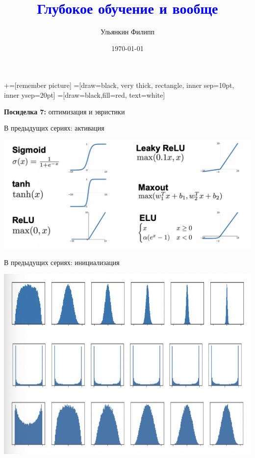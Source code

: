 \documentclass[notes,12pt, aspectratio=169]{beamer}
\title[]{\textcolor{blue}{Глубокое обучение и вообще}}
\author{Ульянкин Филипп}
\date{\today}
\begin{document}
\newcommand\marktopleft[1]{%
    \tikz[overlay,remember picture] 
        \node (marker-#1-a) at (-.3em,.3em) {};%
}
\newcommand\markbottomright[2]{%
    \tikz[overlay,remember picture] 
        \node (marker-#1-b) at (0em,0em) {};%
}
+=[remember picture] 
 =[draw=black, very thick, rectangle, inner sep=10pt, inner ysep=20pt]
 =[draw=black,fill=red, text=white]



\begin{frame}
\maketitle
\centering \textbf{\color{blue} Посиделка 7:}  оптимизация и эвристики
\end{frame}

\begin{frame}{В предыдущих сериях: активация} 
\begin{center}
	\includegraphics[width=.95\linewidth]{prev_activation.png}
\end{center}
\end{frame}


\begin{frame}{В предыдущих сериях: инициализация} 
\begin{center}
	\includegraphics[width=.7\linewidth]{prev_init.png}
\end{center}
\end{frame}
\end{document}
